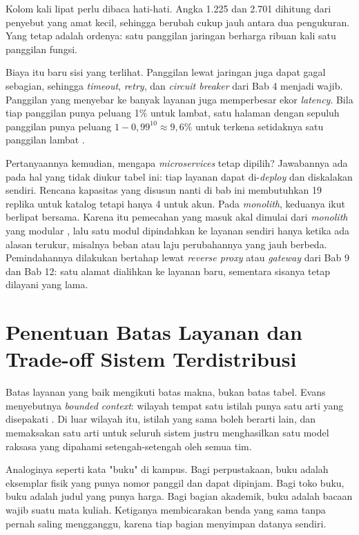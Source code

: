 Kolom kali lipat perlu dibaca hati-hati. Angka 1.225 dan 2.701 dihitung dari
penyebut yang amat kecil, sehingga berubah cukup jauh antara dua pengukuran.
Yang tetap adalah ordenya: satu panggilan jaringan berharga ribuan kali satu
panggilan fungsi.

Biaya itu baru sisi yang terlihat. Panggilan lewat jaringan juga dapat
gagal sebagian, sehingga \textit{timeout}, \textit{retry}, dan \textit{circuit
breaker} dari Bab 4 menjadi wajib. Panggilan yang menyebar ke banyak
layanan juga memperbesar ekor \textit{latency}. Bila tiap panggilan punya
peluang 1\% untuk lambat, satu halaman dengan sepuluh panggilan punya peluang
$1 - 0{,}99^{10} \approx 9{,}6\%$ untuk terkena setidaknya satu panggilan lambat
\cite{dean2013tail}.

Pertanyaannya kemudian, mengapa \textit{microservices} tetap dipilih?
Jawabannya ada pada hal yang tidak diukur tabel ini: tiap layanan dapat
di-\textit{deploy} dan diskalakan sendiri. Rencana kapasitas yang disusun
nanti di bab ini membutuhkan 19 replika untuk katalog tetapi hanya 4 untuk akun.
Pada \textit{monolith}, keduanya ikut berlipat bersama. Karena itu pemecahan
yang masuk akal dimulai dari \textit{monolith} yang modular
\cite{fowler-monolith-first}, lalu satu modul dipindahkan ke layanan sendiri
hanya ketika ada alasan terukur, misalnya beban atau laju perubahannya yang
jauh berbeda. Pemindahannya dilakukan bertahap lewat \textit{reverse proxy}
atau \textit{gateway} dari Bab 9 dan Bab 12: satu alamat dialihkan ke layanan
baru, sementara sisanya tetap dilayani yang lama.

\section{Penentuan Batas Layanan dan Trade-off Sistem Terdistribusi}

Batas layanan yang baik mengikuti batas makna, bukan batas tabel. Evans
menyebutnya \textit{bounded context}: wilayah tempat satu istilah punya satu
arti yang disepakati \cite{evans2003ddd}. Di luar wilayah itu, istilah yang
sama boleh berarti lain, dan memaksakan satu arti untuk seluruh sistem justru
menghasilkan satu model raksasa yang dipahami setengah-setengah oleh semua
tim.

Analoginya seperti kata "buku" di kampus. Bagi perpustakaan, buku adalah
eksemplar fisik yang punya nomor panggil dan dapat dipinjam. Bagi toko buku,
buku adalah judul yang punya harga. Bagi bagian akademik, buku adalah bacaan
wajib suatu mata kuliah. Ketiganya membicarakan benda yang sama tanpa pernah
saling mengganggu, karena tiap bagian menyimpan datanya sendiri.

